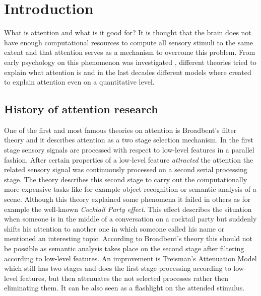 \chapter{Introduction} %
\label{sg:cha:introduction}

What is attention and what is it good for? It is thought that the brain does not have enough computational resources to compute all sensory stimuli to the same extent and that attention serves as a mechanism to overcome this problem. From early psychology on this phenomenon was investigated , different theories tried to explain what attention is and in the last decades different models where created to explain attention even on a quantitative level.

\section{History of attention research} %
\label{sg:sec:attention_as_selection}

One of the first and most famous theories on attention is Broadbent's filter theory  and it describes attention as a two stage selection mechanism. In the first stage sensory signals are processed with respect to low-level features in a parallel fashion. After certain properties of a low-level feature \emph{attracted} the attention the related sensory signal was continuously processed on a second serial processing stage. The theory describes this second stage to carry out the computationally more expensive tasks like for example object recognition or semantic analysis of a scene. Although this theory explained some phenomena it failed in others as for example the well-known \emph{Cocktail Party effect}. This effect describes the situation when someone is in the middle of a conversation on a cocktail party but suddenly shifts his attention to another one in which someone called his name or mentioned an interesting topic. According to Broadbent's theory this should not be possible as semantic analysis takes place on the second stage after filtering according to low-level features. An improvement is Treisman's Attenuation Model  which still has two stages and does the first stage processing according to low-level features, but then attenuates the not selected processes rather then eliminating them. It can be also seen as a flashlight on the attended stimulus.

